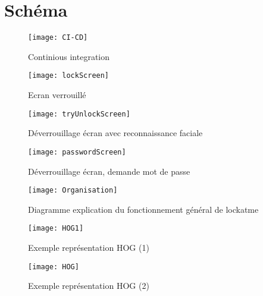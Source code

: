 \appendix
\chapter{Schéma}
\begin{figure}[h]
  \begin{center}
  \texttt{[image: CI-CD]}
  \caption{Continious integration}
  \label{fig:CI-CD}
  \end{center}
\end{figure}

\newpage

\begin{figure}[h]
  \begin{center}
  \texttt{[image: lockScreen]}
  \caption{Ecran verrouillé}
  \label{fig:lockScreen}
\end{center}
\end{figure}

\begin{figure}[h]
  \begin{center}
  \texttt{[image: tryUnlockScreen]}
  \caption{Déverrouillage écran avec reconnaissance faciale}
  \label{fig:tryUnlockScreen}
\end{center}
\end{figure}

\begin{figure}[h]
  \begin{center}
  \texttt{[image: passwordScreen]}
  \caption{Déverrouillage écran, demande mot de passe}
  \label{fig:passwordScreen}
\end{center}
\end{figure}

\begin{figure}[h]
  \begin{center}
  \texttt{[image: Organisation]}
  \caption{Diagramme explication du fonctionnement général de lockatme}
\end{center}
\end{figure}

\begin{figure}[h]
  \begin{center}
  \texttt{[image: HOG1]}
  \caption{Exemple représentation HOG (1)}
  \label{fig:HOG}
\end{center}
\end{figure}

\begin{figure}[h]
  \begin{center}
  \texttt{[image: HOG]}
  \caption{Exemple représentation HOG (2)}
  \label{fig:HOG1}
\end{center}
\end{figure}

